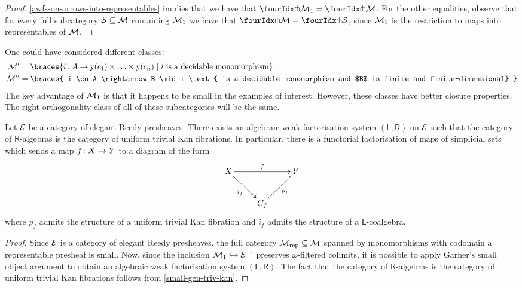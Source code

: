 \documentclass[reqno,10pt,a4paper,oneside,draft]{amsart}
\begin{document}
\begin{proof} \cref{awfs-on-arrows-into-representables} implies that we have that $\liftr{\cal{M}_1} = \liftr{\cal{M}}$.
For the other equalities, observe that for every full subcategory $\cal{S} \subseteq \cal{M}$ containing $\cal{M}_1$ we have that $\liftr{\cal{M}} = \liftr{\cal{S}}$, since $\cal{M}_1$ is the restriction to maps into representables of $\cal{M}$.
\end{proof}

\begin{remark}
One could have considered different classes:
\begin{align*}
  \cal{M}'  &= \braces{ i \co A \rightarrow \yon(c_1) \times \ldots \times \yon(c_n) \mid i \text{ is a decidable monomorphism} }
\\
  \cal{M}'' &= \braces{ i \co A \rightarrow B \mid i \text{ is a decidable monomorphism and $B$ is finite and finite-dimensional} }
\end{align*}
The key advantage of $\cal{M}_1$ is that it happens to be small in the examples of interest.
However, these classes have better closure properties.
The right orthogonality class of all of these subcategories will be the same.
\end{remark}

\begin{theorem}
Let $\catE$ be a category of elegant Reedy presheaves.
There exists an algebraic weak factorisation system $(\mathsf{L}, \mathsf{R})$ on $\cal{E}$ such that the category of $\mathsf{R}$-algebras is the category of uniform trivial Kan fibrations.
In particular, there is a functorial factorisation of maps of simplicial sets which sends a map $f \co X \to Y$ to a diagram of the form
\[
\xymatrix{
  X \ar[rr]^f \ar[dr]_{i_f} & & Y \\
  & C_f \ar[ur]_{p_f}
}
\]
where $p_f$ admits the structure of a uniform trivial Kan fibration and $i_f$ admits the structure of a $\mathsf{L}$-coalgebra.
\end{theorem}

\begin{proof}
Since $\catE$ is a category of elegant Reedy presheaves, the full category $\cal{M}_{\textup{rep}} \subseteq \cal{M}$ spanned by monomorphisms with codomain a representable presheaf is small.
Now, since the inclusion $\cal{M}_1 \hookrightarrow \catE^\to$ preserves $\omega$-filtered colimits, it is possible to apply Garner's small object argument to obtain an algebraic weak factorisation system $(\mathsf{L}, \mathsf{R})$.
The fact that the category of $\mathsf{R}$-algebras is the category of uniform trivial Kan fibrations follows from \cref{small-gen-triv-kan}.
\end{proof}
\end{document}
